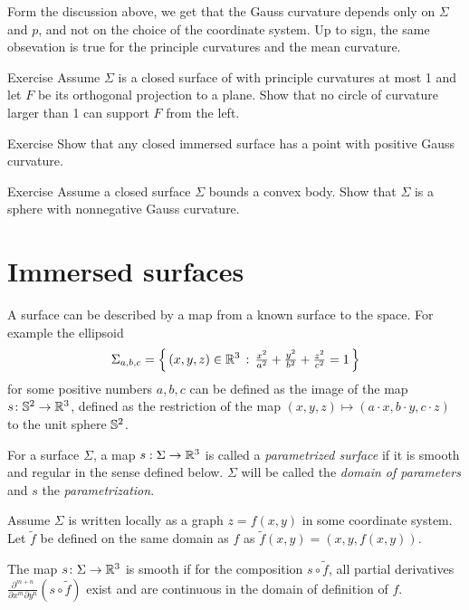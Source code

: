 Form the discussion above, 
we get that the Gauss curvature depends only on $\Sigma$ and $p$,
and not on the choice of the coordinate system.
Up to sign, the same obsevation is true for the principle curvatures and the mean curvature. 


\begin{thm}{Exercise}\label{ex:projection}
Assume $\Sigma$ is a closed surface of with principle curvatures at most 1
and let $F$ be its orthogonal projection to a plane.
Show that no circle of curvature larger than 1 can support $F$ from the left. 
\end{thm}

\begin{thm}{Exercise}
Show that any closed immersed surface has a point with positive Gauss curvature.
\end{thm}

\begin{thm}{Exercise}
Assume a closed surface $\Sigma$ bounds a convex body.
Show that $\Sigma$ is a sphere with nonnegative Gauss curvature. 
\end{thm}

\section{Immersed surfaces}

A surface can be described by a map from a known surface to the space.
For example the ellipsoid
\[\Sigma_{a,b,c}=\left\{\,{(x,y,z)\in\mathbb{R}^3}\,:\,{\tfrac{x^2}{a^2}+\tfrac{y^2}{b^2}+\tfrac{z^2}{c^2}=1}\,\right\}\]
for some positive numbers $a,b,c$ can be defined as the image of the map $s\colon\mathbb{S}^2\to\mathbb{R}^3$, defined as the restriction of the map $(x,y,z)\mapsto (a\cdot x, b\cdot y,c\cdot z)$ to the unit sphere $\mathbb{S}^2$.

For a surface $\Sigma$, a map $s: \Sigma \to \mathbb{R} ^3$ is called a 
\emph{parametrized surface} if it is smooth and regular in the sense defined below. 
$\Sigma$ will be called the \emph{domain of parameters} and $s$ the \emph{parametrization}.

Assume $\Sigma$ is written locally as a graph $z=f(x,y)$ in some coordinate system. Let $\tilde{f} $ be defined on the same domain as $f$ as $\tilde{f}(x,y) = (x,y, f(x,y))$.

The map $s\colon\Sigma \to \mathbb{R}^3$ is  smooth if for the composition $s\circ \tilde{f}$, all partial derivatives $\frac{\partial^{m+n}}{\partial x^m\partial y^n}(s\circ \tilde{f})$ exist and are continuous in the domain of definition of $f$.

